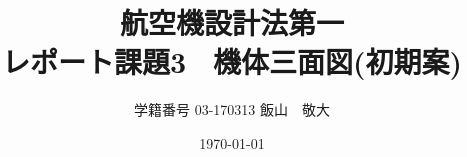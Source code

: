 \title{航空機設計法第一 \\
レポート課題3 \ 機体三面図(初期案)}
\author{学籍番号 03-170313 飯山　敬大\\
        }
\date{\today}

\usepackage[utf8]{inputenc}				%
\usepackage[ipaex]{pxchfon}
\usepackage{pifont}
\usepackage{mathtools, amssymb, mathrsfs, bbm,nccmath}	%
\usepackage{siunitx, physics}
\usepackage[table]{xcolor}				%
\usepackage{tabularx}
\usepackage[dvipdfmx]{graphicx}					%
\usepackage{subcaption, wrapfig}
\usepackage{tikz}
\usetikzlibrary{calc, patterns, decorations, angles, calendar, backgrounds, shadows, mindmap}
\usepackage{tcolorbox}					%
\usepackage{longtable, float, multirow, array, listliketab, enumitem, tabularx}
\usepackage{listings,plistings}					%
\usepackage{comment}
\usepackage{hyperref}					%
\usepackage{url}
\usepackage{pxjahyper}
\usepackage{overcite}					%
\usepackage{pxrubrica}					%
\usepackage{fancyhdr, lastpage}			%
\usepackage{import, grffile}			%
\usepackage{standalone}
\usepackage{bm}
\usepackage{empheq}
\usepackage{pdfpages}
\usepackage{multicol}
\usepackage[top=30truemm,bottom=30truemm,left=25truemm,right=25truemm]{geometry}
\usepackage{dirtree}

\setlength{\lineskiplimit}{6pt}
\setlength{\lineskip}{6pt}

\setlength{\parindent}{1zw}
\setlength{\mathindent}{5zw}

\renewcommand{\citeform}[1]{[#1]}


\hypersetup{%
	bookmarksnumbered = true,%
	hidelinks,%
	colorlinks = true,%
	linkcolor = black,%
	urlcolor = cyan,%
	citecolor = black,%
	filecolor = magenta,%
	setpagesize = false,%
	}

\pdfstringdefDisableCommands{%
\renewcommand*{\bm}[1]{#1}%
}
\setcounter{tocdepth}{3}


\newcommand{\fracomega}[1]{\displaystyle \frac{1}{2} \omega_{#1}}
\newcommand{\fracq}[1]{\displaystyle \frac{1}{2} q_{#1}}
\newcommand{\fracI}[3]{\displaystyle \frac{I_{#1}-I_{#2}}{I_{#3}} \omega_{I_{#1}}}
